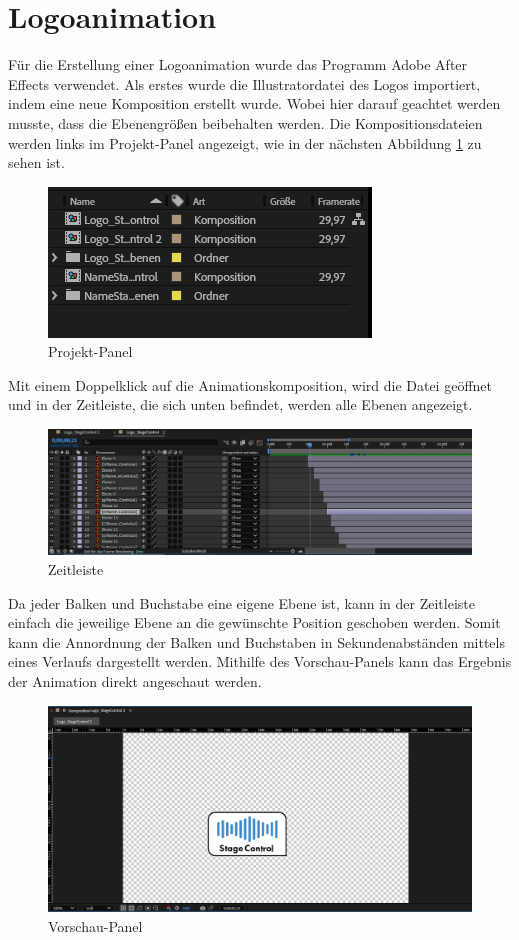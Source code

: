 \section{Logoanimation}
Für die Erstellung einer Logoanimation wurde das Programm Adobe After Effects verwendet. Als erstes wurde die Illustratordatei des Logos importiert, indem eine neue Komposition erstellt wurde. Wobei hier darauf geachtet werden musste, dass die Ebenengrößen beibehalten werden. Die Kompositionsdateien werden links im Projekt-Panel angezeigt, wie in der nächsten Abbildung \ref{fig:Projekt-Panel} zu sehen ist.

\begin{figure}[H]
	\centering
	\includegraphics[width=0.5\linewidth]{images/Projekt-Panel.png}
	\caption[Projekt-Panel]{Projekt-Panel}
	\label{fig:Projekt-Panel}
\end{figure} 

Mit einem Doppelklick auf die Animationskomposition, wird die Datei geöffnet und in der Zeitleiste, die sich unten befindet, werden alle Ebenen angezeigt. 

\begin{figure}[H]
	\centering
	\includegraphics[width=0.5\linewidth]{images/Zeitleiste.png}
	\caption[Zeitleiste]{Zeitleiste}
	\label{fig:Zeitleiste}
\end{figure} 

\newpage
Da jeder Balken und Buchstabe eine eigene Ebene ist, kann in der Zeitleiste einfach die jeweilige Ebene an die gewünschte Position geschoben werden. Somit kann die Annordnung der Balken und Buchstaben in Sekundenabständen mittels eines Verlaufs dargestellt werden. Mithilfe des Vorschau-Panels kann das Ergebnis der Animation direkt angeschaut werden. 

\begin{figure}[H]
	\centering
	\includegraphics[width=0.5\linewidth]{images/Vorschau-Panel.png}
	\caption[Vorschau-Panel]{Vorschau-Panel}
	\label{fig:Vorschau-Panel}
\end{figure} 

